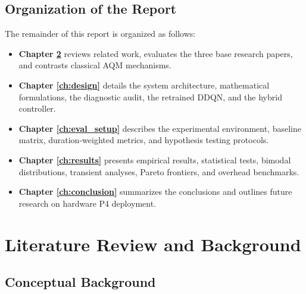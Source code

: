 \documentclass[12pt,a4paper,oneside]{report}
\begin{document}
\section{Organization of the Report}
The remainder of this report is organized as follows:
\begin{itemize}
  \item \textbf{Chapter \ref{ch:lit_review}} reviews related work, evaluates the three base research papers, and contrasts classical AQM mechanisms.
  \item \textbf{Chapter \ref{ch:design}} details the system architecture, mathematical formulations, the diagnostic audit, the retrained DDQN, and the hybrid controller.
  \item \textbf{Chapter \ref{ch:eval_setup}} describes the experimental environment, baseline matrix, duration-weighted metrics, and hypothesis testing protocols.
  \item \textbf{Chapter \ref{ch:results}} presents empirical results, statistical tests, bimodal distributions, transient analyses, Pareto frontiers, and overhead benchmarks.
  \item \textbf{Chapter \ref{ch:conclusion}} summarizes the conclusions and outlines future research on hardware P4 deployment.
\end{itemize}


\chapter{Literature Review and Background}
\label{ch:lit_review}

\section{Conceptual Background}
\end{document}
